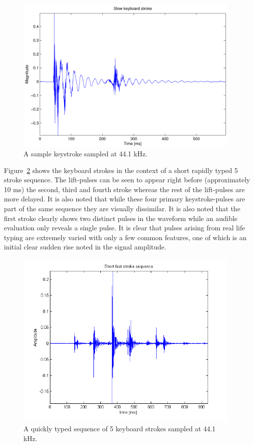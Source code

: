 \begin{figure}
  \begin{center}
    \includegraphics[width=110mm]{KeyboardStrokeSlowIntro.pdf}
    \caption{A sample keystroke sampled at 44.1 kHz.}\label{fig:KeyboardStrokeSlowIntro.pdf}
  \end{center}
\end{figure}

Figure~\ref{fig:shortFastSeq.png} shows the keyboard strokes in the context of a short rapidly typed 5 stroke sequence. The lift-pulses can be seen to appear right before (approximately 10 ms) the second, third and fourth stroke whereas the rest of the lift-pulses are more delayed. It is also noted that while these four primary keystroke-pulses are part of the same sequence they are visually dissimilar. It is also noted that the first stroke clearly shows two distinct pulses in the waveform while an audible evaluation only reveals a single pulse. It is clear that pulses arising from real life typing are extremely varied with only a few common features, one of which is an initial clear sudden rise noted in the signal amplitude.

\begin{figure}
  \begin{center}
    \includegraphics[width=110mm]{shortFastSeq.png}
    \caption{A quickly typed sequence of 5 keyboard strokes sampled at 44.1 kHz.}\label{fig:shortFastSeq.png}
  \end{center}
\end{figure}

